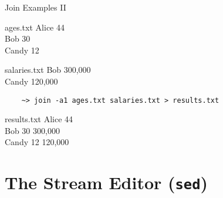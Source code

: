 \begin{frame}[fragile]{Join Examples II}
  \begin{block}{ages.txt}
    {\footnotesize\ttfamily
      Alice 44\\
      Bob 30\\
      Candy 12\\
    }
  \end{block}
  \begin{block}{salaries.txt}
    {\footnotesize\ttfamily
      Bob 300,000\\
      Candy 120,000\\
    }
  \end{block}
  \begin{verbatim}
    ~> join -a1 ages.txt salaries.txt > results.txt
  \end{verbatim}
  \begin{block}{results.txt}
    {\footnotesize\ttfamily
      Alice 44\\
      Bob 30 300,000\\
      Candy 12 120,000\\
    }
  \end{block}
\end{frame}

%

%
\section{The Stream Editor (\texttt{sed})}
\label{sec:the_stream_editor_-_sed}

